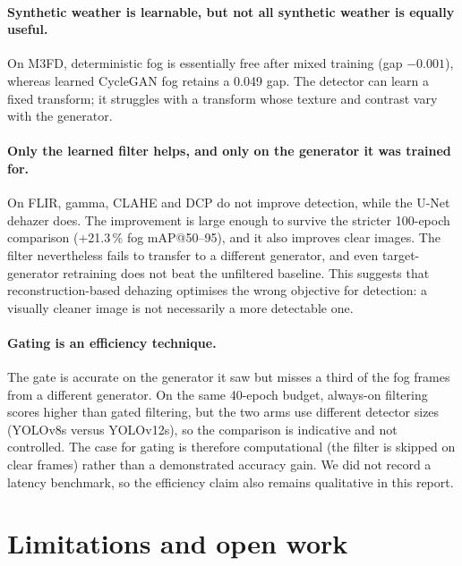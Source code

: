 \documentclass[11pt,a4paper]{article}
\begin{document}
\paragraph{Synthetic weather is learnable, but not all synthetic weather is equally useful.}
On M3FD, deterministic fog is essentially free after mixed training (gap
$-0.001$), whereas learned CycleGAN fog retains a 0.049 gap. The detector can
learn a fixed transform; it struggles with a transform whose texture and contrast
vary with the generator.

\paragraph{Only the learned filter helps, and only on the generator it was trained for.}
On FLIR, gamma, CLAHE and DCP do not improve detection, while the U-Net dehazer
does. The improvement is large enough to survive the stricter 100-epoch
comparison (+21.3\,\% fog mAP@50--95), and it also improves clear images. The
filter nevertheless fails to transfer to a different generator, and even
target-generator retraining does not beat the unfiltered baseline. This suggests
that reconstruction-based dehazing optimises the wrong objective for detection:
a visually cleaner image is not necessarily a more detectable one.

\paragraph{Gating is an efficiency technique.}
The gate is accurate on the generator it saw but misses a third of the fog frames
from a different generator. On the same 40-epoch budget, always-on filtering
scores higher than gated filtering, but the two arms use different detector
sizes (YOLOv8s versus YOLOv12s), so the comparison is indicative and not
controlled. The case for gating is therefore computational (the filter is
skipped on clear frames) rather than a demonstrated accuracy gain. We did not
record a latency benchmark, so the efficiency claim also remains qualitative in
this report.

\section{Limitations and open work}
\label{sec:limitations}
\end{document}
